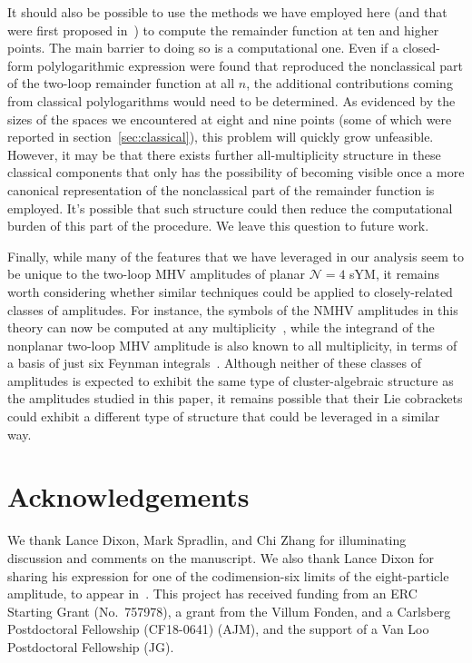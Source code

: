 \documentclass[11pt]{article}
\begin{document}
It should also be possible to use the methods we have employed here (and that were first proposed in~\cite{Golden:2014xqf}) to compute the remainder function at ten and higher points. The main barrier to doing so is a computational one. Even if a closed-form polylogarithmic expression were found that reproduced the nonclassical part of the two-loop remainder function at all $n$, the additional contributions coming from classical polylogarithms would need to be determined. As evidenced by the sizes of the spaces we encountered at eight and nine points (some of which were reported in section~\ref{sec:classical}), this problem will quickly grow unfeasible. However, it may be that there exists further all-multiplicity structure in these classical components that only has the possibility of becoming visible once a more canonical representation of the nonclassical part of the remainder function is employed. It's possible that such structure could then reduce the computational burden of this part of the procedure. We leave this question to future work.

Finally, while many of the features that we have leveraged in our analysis seem to be unique to the two-loop MHV amplitudes of planar $\mathcal{N}=4$ sYM, it remains worth considering whether similar techniques could be applied to closely-related classes of amplitudes. For instance, the symbols of the NMHV amplitudes in this theory can now be computed at any multiplicity~\cite{Zhang:2019vnm,He:2020vob}, while the integrand of the nonplanar two-loop MHV amplitude is also known to all multiplicity, in terms of a basis of just six Feynman integrals~\cite{Bourjaily:2019iqr,Bourjaily:2019gqu}. Although neither of these classes of amplitudes is expected to exhibit the same type of cluster-algebraic structure as the amplitudes studied in this paper, it remains possible that their Lie cobrackets could exhibit a different type of structure that could be leveraged in a similar way. 


\section*{Acknowledgements}

We thank Lance Dixon, Mark Spradlin, and Chi Zhang for illuminating discussion and comments on the manuscript. We also thank Lance Dixon for sharing his expression for one of the codimension-six limits of the eight-particle amplitude, to appear in~\cite{Lance_to_appear}. This project has received funding from an ERC Starting Grant \mbox{(No.\ 757978)}, a grant from the Villum Fonden, and a Carlsberg Postdoctoral Fellowship (CF18-0641) (AJM), and the support of a Van Loo Postdoctoral Fellowship (JG).



\end{document}
